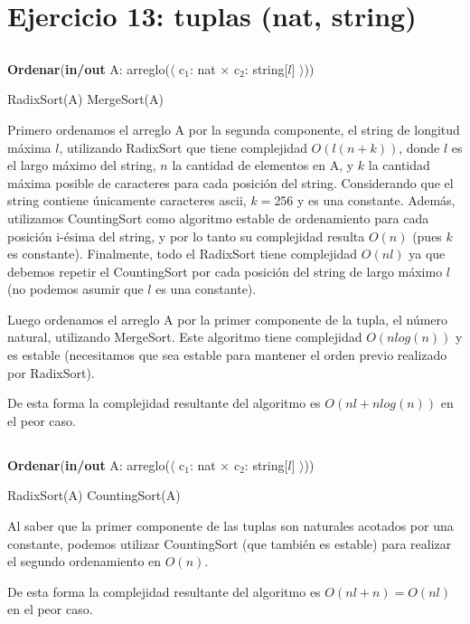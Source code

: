 \section{Ejercicio 13: tuplas (nat, string)}

\subsection{}

\begin{algorithm}[H]
\caption{
    \textbf{Ordenar}(\textbf{in/out} A: arreglo($\langle$ c$_1$: nat × c$_2$: string[$l$] $\rangle$))
}
\begin{algorithmic}[1]
    \State RadixSort(A) 
    \State MergeSort(A) 
\end{algorithmic}
\end{algorithm}

Primero ordenamos el arreglo A por la segunda componente, el string de longitud máxima $l$, utilizando RadixSort que tiene complejidad $O(l(n + k))$, donde $l$ es el largo máximo del string, $n$ la cantidad de elementos en A, y $k$ la cantidad máxima posible de caracteres para cada posición del string. Considerando que el string contiene únicamente caracteres ascii, $k=256$ y es una constante. Además, utilizamos CountingSort como algoritmo estable de ordenamiento para cada posición i-ésima del string, y por lo tanto su complejidad resulta $O(n)$ (pues $k$ es constante). Finalmente, todo el RadixSort tiene complejidad $O(nl)$ ya que debemos repetir el CountingSort por cada posición del string de largo máximo $l$ (no podemos asumir que $l$ es una constante).

Luego ordenamos el arreglo A por la primer componente de la tupla, el número natural, utilizando MergeSort. Este algoritmo tiene complejidad $O(n log(n))$ y es estable (necesitamos que sea estable para mantener el orden previo realizado por RadixSort).

De esta forma la complejidad resultante del algoritmo es $O(nl + n log(n))$ en el peor caso.

\subsection{}

\begin{algorithm}[H]
\caption{
    \textbf{Ordenar}(\textbf{in/out} A: arreglo($\langle$ c$_1$: nat × c$_2$: string[$l$] $\rangle$))
}
\begin{algorithmic}[1]
    \State RadixSort(A) 
    \State CountingSort(A) 
\end{algorithmic}
\end{algorithm}

Al saber que la primer componente de las tuplas son naturales acotados por una constante, podemos utilizar CountingSort (que también es estable) para realizar el segundo ordenamiento en $O(n)$.

De esta forma la complejidad resultante del algoritmo es $O(nl + n) = O(nl)$ en el peor caso.
